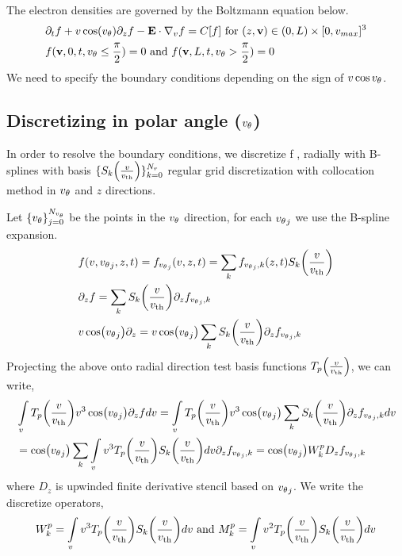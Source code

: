 \documentclass{article}[draft]
\begin{document}
The electron densities are governed by the Boltzmann equation below. 
\begin{align*}
&	\partial_t f + v\cos\of{\vtheta} \partial_z f -\vect{E}\cdot\nabla_v f = C[f] \text{ for } (z,\vect{v}) \in (0,L) \times[0,v_{max}]^3 \\
& f(\vect{v}, 0, t, \vtheta \leq \frac{\pi}{2})	= 0 \text{ and } f(\vect{v}, L, t, \vtheta > \frac{\pi}{2})	= 0
\end{align*}
We need to specify the boundary conditions depending on the sign of $v \cos{v_{\theta}}$.

\subsection{Discretizing in polar angle (${v_{\theta}}$)}
In order to resolve the boundary conditions, we discretize f , radially with B-splines with basis $\{S_k\of{\frac{v}{\vth}}\}_{k=0}^{N_r}$ regular grid discretization with collocation method in ${v_{\theta}}$ and $z$ directions. 

Let $\{{v_{\theta}}\}_{j=0}^{N_{v_{\theta}}}$ be the points in the ${v_{\theta}}$ direction, for each ${v_{\theta}}_j$ we use the B-spline expansion. 
\begin{align*}
	&f(v, \vtheta_j , z, t) = f_{\vtheta_j} (v, z, t) = \sum_k f_{\vtheta_j, k} \of{z,t} S_k\of{\frac{v}{\vth}} \\
	& \partial_z f = \sum_{k} S_k\of{\frac{v}{\vth}} \partial_z f_{\vtheta_j, k} \\
	& v\cos\of{\vtheta_j} \partial_z  = v\cos\of{\vtheta_j} \sum_{k} S_k\of{\frac{v}{\vth}} \partial_z f_{\vtheta_j, k}
\end{align*} Projecting the above onto radial direction test basis functions $T_p\of{\frac{v}{\vth}}$, we can write, 
\begin{align*}
&\myint_v T_p \of{\frac{v}{\vth}} v^3 \cos\of{\vtheta_j} \partial_z f dv = \myint_v T_p \of{\frac{v}{\vth}} v^3\cos\of{\vtheta_j} \sum_{k} S_k\of{\frac{v}{\vth}} \partial_z f_{\vtheta_j, k} dv \\
&=\cos\of{\vtheta_j} \sum_k \myint_v v^3 T_p\of{\frac{v}{\vth}} S_k\of{\frac{v}{\vth}} dv \partial_z f_{\vtheta_j,k} = \cos\of{\vtheta_j} W^{p}_{k} D_z f_{\vtheta_j,k}
\end{align*} where $D_z$ is upwinded finite derivative stencil based on ${v_{\theta}}_j$. We write the discretize operators, 
\begin{align*}
W^{p}_{k} = \myint_v v^3 T_p\of{\frac{v}{\vth}} S_k\of{\frac{v}{\vth}} dv \text{ and }
M^{p}_{k} = \myint_v v^2 T_p\of{\frac{v}{\vth}} S_k\of{\frac{v}{\vth}} dv
\end{align*} 
\end{document}
